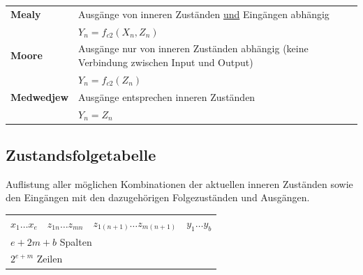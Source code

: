                 


\begin{flushleft}
    \renewcommand{\arraystretch}{1.25}
    \begin{tabular}{l p{44mm}}
        \textbf{Mealy} & Ausgänge von inneren Zuständen \underline{und} Eingängen abhängig\\
        & $Y_n = f_{c2}(X_n, Z_n)$\\
        \hline
        \textbf{Moore} & Ausgänge nur von inneren Zuständen abhängig (keine Verbindung zwischen Input und Output)\\
        & $Y_n = f_{c2}(Z_n)$\\
        \hline
        \textbf{Medwedjew} & Ausgänge entsprechen inneren Zuständen \\
        & $Y_n = Z_n$
    \end{tabular}
\end{flushleft}
\subsection{Zustandsfolgetabelle}
Auflistung aller möglichen Kombinationen der aktuellen inneren Zuständen sowie den Eingängen mit den dazugehörigen Folgezuständen und Ausgängen.
\begin{flushleft}
    \small
    \renewcommand{\arraystretch}{1.5}
    \begin{tabular}{c|c|c|c}
        $x_1 \dots x_e$ & $z_{1n} \dots z_{mn}$ & $z_{1(n+1)} \dots z_{m(n+1)}$ & $y_{1} \dots y_{b}$\\
        \multicolumn{4}{l}{$e + 2m + b$ Spalten}\\
        \multicolumn{4}{l}{$2^{e + m}$ Zeilen}\\
    \end{tabular}
\end{flushleft}
